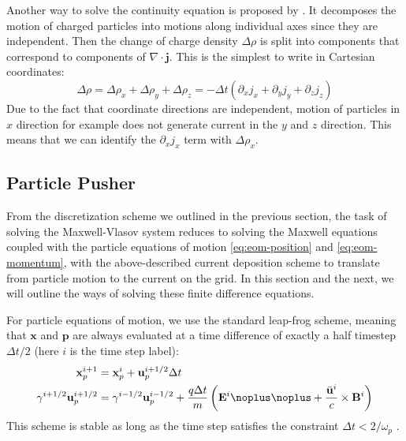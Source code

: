 Another way to solve the continuity equation is proposed by
\citet{esirkepov_exact_2001}. It decomposes the motion of charged particles into
motions along individual axes since they are independent. Then the change of
charge density $\Delta\rho$ is split into components that correspond to
components of $\nabla\cdot \mathbf{j}$. This is the simplest to write in
Cartesian coordinates:
\begin{equation}
  \label{eq:esirkepov-split}
  \Delta \rho = \Delta\rho_{x} + \Delta\rho_{y} + \Delta\rho_{z} = -\Delta t(\partial_{x}j_{x} + \partial_{y}j_{y} + \partial_{z}j_{z})
\end{equation}
Due to the fact that coordinate directions are independent, motion of particles
in $x$ direction for example does not generate current in the $y$ and $z$
direction. This means that we can identify the $\partial_{x}j_{x}$ term with
$\Delta \rho_{x}$.




\subsection{Particle Pusher}
\label{sec:finite-difference}

From the discretization scheme we outlined in the previous section, the task of
solving the Maxwell-Vlasov system reduces to solving the Maxwell equations
coupled with the particle equations of motion \eqref{eq:eom-position} and
\eqref{eq:eom-momentum}, with the above-described current deposition scheme to
translate from particle motion to the current on the grid. In this section and
the next, we will outline the ways of solving these finite difference equations.

For particle equations of motion, we use the standard leap-frog scheme, meaning
that $\mathbf{x}$ and $\mathbf{p}$ are always evaluated at a time difference of
exactly a half timestep $\Delta t/2$ (here $i$ is the time step label):
\begin{align}
  \label{eq:leap-frog-particle}
    \mathbf{x}_{p}^{i+1} &= \mathbf{x}_{p}^{i} +\mathbf{u}_{p}^{i+1/2} \Delta t \\
    \gamma^{i+1/2} \mathbf{u}_{p}^{i+1/2} &= \gamma^{i-1/2}
    \mathbf{u}_{p}^{i-1/2} + \frac{q \Delta t}{m} \left( \mathbf{E}^{i}
    \noplus \noplus + \frac{\bar{\mathbf{u}}^{i}}{c}
    \times \mathbf{B}^{i} \right)
\end{align}
This scheme is stable as long as the time step satisfies the constraint $\Delta
t < 2/\omega_p$ \citep{tajima_computational_1989}.


